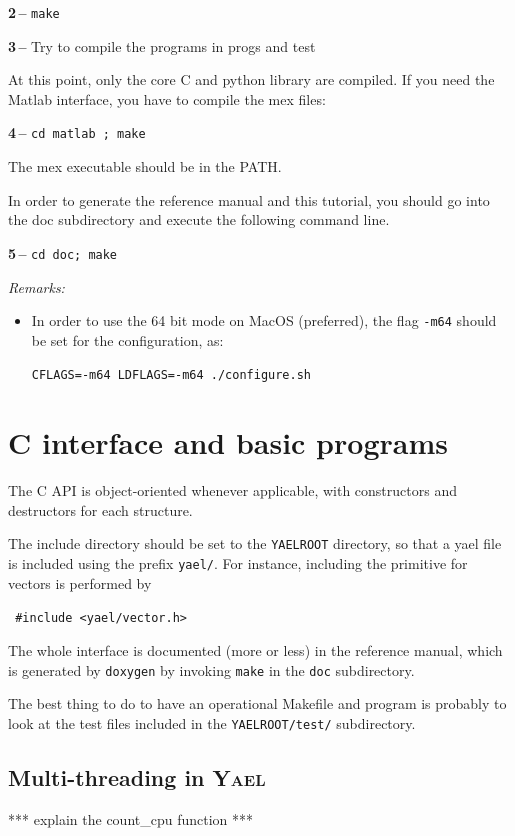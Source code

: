 \documentclass[a4paper,11pt,notitlepage,final,twoside]{report}
\newcommand{\yael}{\textsc{Yael}\xspace}
\newcommand{\yroot}{\texttt{YAELROOT}\xspace}
\newcommand{\tc}[1]{\texttt{#1}}
\newcommand{\code}[1]{\smallskip 

\texttt{#1} 
 \medskip

}
\begin{document}
{\bf 2\,--} \tc{make}
\bigskip

{\bf 3\,--} Try to compile the programs in progs and test
\medskip

At this point, only the core C and python library are compiled. 
If you need the Matlab interface, you have to compile the mex files:
\bigskip

{\bf 4\,--} \tc{cd matlab ; make}
\smallskip

The mex executable should be in the PATH. 
\bigskip

In order to generate the reference manual and this tutorial, you should go into the 
doc subdirectory and execute the following command line. 
\smallskip

{\bf 5\,--} \tc{cd doc; make}
\bigskip

{\it Remarks:}
\begin{itemize}
\item In order to use the 64 bit mode on MacOS (preferred), 
the flag \tc{-m64} should be set for the configuration, as:
\code{CFLAGS=-m64 LDFLAGS=-m64 ./configure.sh}
\end{itemize}


\chapter{C interface and basic programs}

The C API is object-oriented whenever applicable, with constructors and destructors for each structure. 
\medskip

The include directory should be set to the \yroot directory, so that a yael file is included using the prefix \texttt{yael/}. 
For instance, including the primitive for vectors is performed by
\code{
\#include <yael/vector.h>
}
\medskip

The whole interface is documented (more or less) in the reference manual, which is generated by \texttt{doxygen} by invoking \texttt{make} in the \texttt{doc} subdirectory. 
\medskip

The best thing to do to have an operational Makefile and program 
is probably to look at the test files included in the 
\tc{\yroot/test/} subdirectory. 
\bigskip

\section{Multi-threading in \yael}

*** explain the count_cpu function ***
\end{document}
